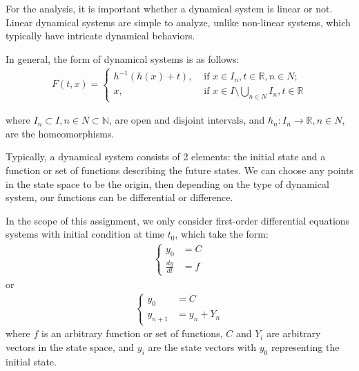 \documentclass[a4paper]{article}
\numberwithin{equation}{section}
\begin{document}
For the analysis, it is important whether a dynamical system is linear or not.
Linear dynamical systems are simple to analyze, unlike non-linear systems, which typically have intricate dynamical behaviors.

In general, the form of dynamical systems is as follows\cite{sibirsky1975topology}:
\begin{align*}
  F(t, x) = \begin{cases}
    h^{-1}(h(x) + t), & \text{ if } x \in I_n, t \in \mathbb{R}, n \in N;                     \\
    x,                & \text{ if } x \in I \setminus \bigcup_{n \in N} I_n, t \in \mathbb{R}
  \end{cases}
\end{align*}

where \( I_n \subset I, n \in N \subset \mathbb{N} \), are open and disjoint intervals, and \( h_n : I_n \rightarrow \mathbb{R}, n \in N \), are the homeomorphisms.

Typically, a dynamical system consists of 2 elements: the initial state and a function or set of functions describing the future states.
We can choose any points in the state space to be the origin, then depending on the type of dynamical system, our functions can be differential or difference.

In the scope of this assignment, we only consider first-order differential equations systems with initial condition at time \( t_0 \), which take the form:
\begin{align*}
  \begin{cases}
    y_0           & = C \\
    \frac{dy}{dt} & = f
  \end{cases}
\end{align*}
or
\begin{align*}
  \begin{cases}
    y_0       & = C         \\
    y_{n + 1} & = y_n + Y_n
  \end{cases}
\end{align*}
where \( f \) is an arbitrary function or set of functions, \( C \) and \( Y_i \) are arbitrary vectors in the state space, and \( y_i \) are the state vectors with \( y_0 \) representing the initial state.
\end{document}
